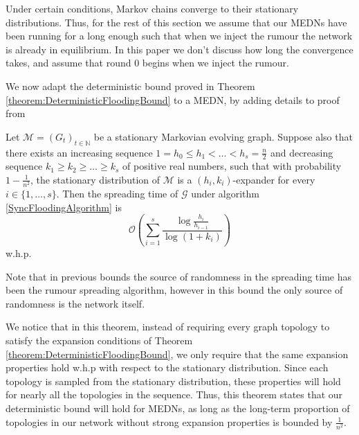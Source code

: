 Under certain conditions, Markov chains converge to their stationary distributions. Thus, for the rest of this section we assume that our MEDNs have been running for a long enough such that when we inject the rumour the network is already in equilibrium. In this paper we don't discuss how long the convergence takes, and assume that round 0 begins when we inject the rumour.

We now adapt the deterministic bound proved in Theorem \ref{theorem:DeterministicFloodingBound} to a MEDN, by adding details to proof from \cite{syncPaper}


\begin{theorem}\label{theorem:markovSyncBound}
	Let $\mathcal{M} = (G_t)_{t \in \mathbb{N}}$  be a stationary Markovian evolving graph. Suppose also that there exists an increasing sequence $1 = h_0 \leq h_1 < \dots < h_s = \frac{n}{2}$ and decreasing sequence $k_1 \geq k_2 \geq \dots \geq k_s$ of positive real numbers, such that with probability $1-\frac{1}{n^2}$, the stationary distribution of $\mathcal{M}$ is a $(h_i, k_i)$-expander for every $i \in \{1, \dots , s\}$. Then the spreading time of $\mathcal{G}$ under algorithm \ref{SyncFloodingAlgorithm} is
	$$
		\mathcal{O}\left(\sum_{i=1}^s \frac{\log \frac{h_i}{h_{i-1}}}{\log(1+k_i)}\right)
	$$
	w.h.p.
\end{theorem}

Note that in previous bounds the source of randomness in the spreading time has been the rumour spreading algorithm, however in this bound the only source of randomness is the network itself.

We notice that in this theorem, instead of requiring every graph topology to satisfy the expansion conditions of Theorem \ref{theorem:DeterministicFloodingBound}, we only require that the same expansion properties hold w.h.p with respect to the stationary distribution. 
Since each topology is sampled from the stationary distribution, these properties will hold for nearly all the topologies in the sequence. Thus, this theorem states that our deterministic bound will hold for MEDNs, as long as the long-term proportion of topologies in our network without strong expansion properties is bounded by $\frac{1}{n^2}$.

